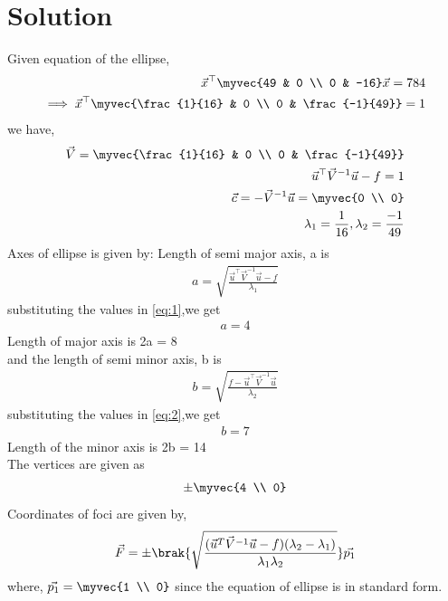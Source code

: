 \documentclass[journal,12pt,twocolumn]{IEEEtran}
\begin{document}
\section{Solution}
Given equation of the ellipse,
\begin{align}
  \vec{x}^{\top}\myvec{49 & 0 \\ 0 & -16}\vec{x} = 784
  \\
  \implies \vec{x}^{\top}\myvec{\frac{1}{16} & 0 \\ 0 & \frac{-1}{49}} = 1
\end{align}
we have,
\begin{align}
    \vec{V} = \myvec{\frac{1}{16} & 0 \\ 0 & \frac{-1}{49}}
    \\
    \vec{u}^{\top}\vec{V}^{-1}\vec{u}-f = 1
    \\
    \vec{c} = -\vec{V}^{-1}\vec{u}=\myvec{0 \\ 0}
    \\
    \lambda_1 = \frac{1}{16} , \lambda_2 = \frac{-1}{49}
\end{align}
Axes of ellipse is given by:
Length of semi major axis, a is
\begin{align}
  a = \sqrt{\frac{\vec{u}^{\top}\vec{V}^{-1}\vec{u}-f}{\lambda_1}} \label{eq:1}
 \end{align}
 substituting the values in \eqref{eq:1},we get
 \begin{align}
    a = 4
 \end{align}
Length of major axis is 2a = 8
\\
 and the length of semi minor axis, b is
  \begin{align}
    b = \sqrt{\frac{f-\vec{u}^{\top}\vec{V}^{-1}\vec{u}}{\lambda_2}} \label{eq:2}
 \end{align}
 substituting the values in \eqref{eq:2},we get
 \begin{align}
    b = 7 
\end{align}
 Length of the minor axis is 2b = 14
\\
The vertices are given as
\begin{align}
    \pm\myvec{4 \\ 0} 
\end{align}
Coordinates of foci are given by,
\begin{align}
  \vec{F} =\pm\brak{\sqrt{\frac{(\vec{u}^T\vec{V}^{-1}\vec{u}-f)(\lambda_2-\lambda_1)}{\lambda_1\lambda_2}}}\vec{p_1} \label{eq:3}
\end{align}
where, $\vec{p_1} = \myvec{1 \\ 0}$ since the equation of ellipse is in standard form.
\end{document}
